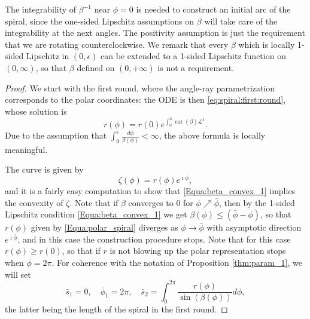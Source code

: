 \documentclass[reqno]{amsart}
\newcounter{assu}
\theoremstyle{definition} \newtheorem{definition}{Definition}[section]
\theoremstyle{definition} \newtheorem{remark}[definition]{Remark}
\theoremstyle{plain} \newtheorem{lemma}[definition]{Lemma}
\theoremstyle{plain} \newtheorem{proposition}[definition]{Proposition}
\theoremstyle{plain} \newtheorem{theorem}[definition]{Theorem}
\theoremstyle{plain} \newtheorem{corollary}[definition]{Corollary}
\theoremstyle{definition} \newtheorem{example}[definition]{Example}
\theoremstyle{plain} \newtheorem{claim}[clai]{Claim}
\theoremstyle{definition} \newtheorem{assumption}[definition]{Assumption}
\theoremstyle{definition} \newtheorem{observation}[definition]{Observation}
\newcommand{\1}{\mathbbm 1}
\renewcommand{\i}{\imath}
\numberwithin{equation}{section} %
\theoremstyle{plain} \newtheorem*{theorem*}{Theorem}
\theoremstyle{plain} \newtheorem{mthm}[maintheorem]{Main Theorem}
\theoremstyle{plain} \newtheorem*{mthm*}{Main Theorem}
\theoremstyle{plain} \newtheorem*{conjecture*}{Conjecture}
\theoremstyle{plain} \newtheorem{conjecture}[definition]{Conjecture}
\theoremstyle{plain} \newtheorem*{problem*}{Problem}
\begin{document}
The integrability of $\beta^{-1}$ near $\phi = 0$ is needed to construct an initial arc of the spiral, since the one-sided Lipschitz assumptions on $\beta$ will take care of the integrability at the next angles. The positivity assumption is just the requirement that we are rotating counterclockwise. We remark that every $\beta$ which is locally 1-sided Lipschitz in $(0,\epsilon)$ can be extended to a 1-sided Lipschitz function on $(0,\infty)$, so that $\beta $ defined on $(0,+\infty)$ is not a requirement.

\begin{proof}
We start with the first round, where the angle-ray parametrization corresponds to the polar coordinates: the ODE is then \eqref{eq:spiral:first:round}, whose solution is
\begin{equation}
\label{Equa:polar_spiral}
r(\phi) = r(0) e^{\int_0^\phi \cot(\beta) \mathscr L^1}.
\end{equation}
Due to the assumption that $\int_0^\epsilon \frac{d\phi}{\beta(\phi)} < \infty$, the above formula is locally meaningful.

The curve is given by
\begin{equation*}
\zeta(\phi) = r(\phi) e^{\i \phi},
\end{equation*}
and it is a fairly easy computation to show that \eqref{Equa:beta_convex_1} implies the convexity of $\zeta$. Note that if $\beta$ converges to $0$ for $\phi \nearrow \bar \phi$, then by the 1-sided Lipschitz condition \eqref{Equa:beta_convex_1} we get $\beta(\phi) \leq (\bar \phi - \phi)$, so that $r(\phi)$ given by \eqref{Equa:polar_spiral} diverges as $\phi \to \bar \phi$ with asymptotic direction $e^{\i \bar \phi}$, and in this case the construction procedure stops. Note that for this case $r(\phi) \geq r(0)$, so that if $r$ is not blowing up the polar representation stops when $\phi = 2\pi$. For coherence with the notation of Proposition \ref{thm:param_1}, we will set
\begin{equation*}
\bar s_1 = 0, \quad \bar \phi_1 = 2\pi, \quad \bar s_2 = \int_0^{2\pi} \frac{r(\phi)}{\sin(\beta(\phi))} d\phi,
\end{equation*}
the latter being the length of the spiral in the first round.

\medskip


\end{proof}
\end{document}
